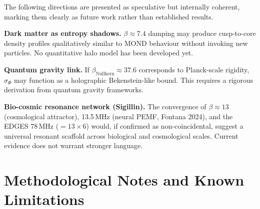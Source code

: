 \documentclass[12pt,a4paper]{article}
\theoremstyle{definition}
\newcommand{\sigphi}{\sigma_{\Phi}}
\begin{document}
The following directions are presented as speculative but internally coherent,
marking them clearly as future work rather than established results.

\begin{speculative}
\textbf{Dark matter as entropy shadows.}
$\beta \approx 7.4$ damping may produce cusp-to-core density profiles
qualitatively similar to MOND behaviour without invoking new particles.
No quantitative halo model has been developed yet.
\end{speculative}

\begin{speculative}
\textbf{Quantum gravity link.}
If $\beta_{\mathrm{Nullkern}} \approx 37.6$ corresponds to Planck-scale
rigidity, $\sigphi$ may function as a holographic Bekenstein-like bound.
This requires a rigorous derivation from quantum gravity frameworks.
\end{speculative}

\begin{speculative}
\textbf{Bio-cosmic resonance network (Sigillin).}
The convergence of $\beta \approx 13$ (cosmological attractor),
13.5\,MHz (neural PEMF, Fontana 2024), and the EDGES 78\,MHz
($= 13 \times 6$) would, if confirmed as non-coincidental,
suggest a universal resonant scaffold across biological and cosmological scales.
Current evidence does not warrant stronger language.
\end{speculative}

\section{Methodological Notes and Known Limitations}
\end{document}
